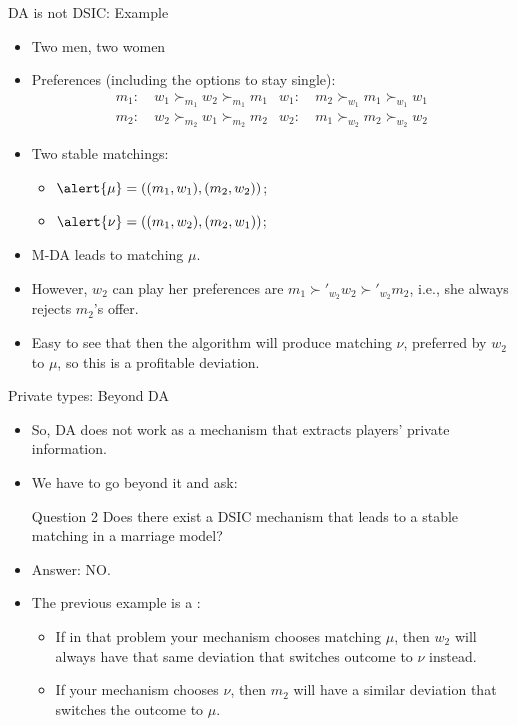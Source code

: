 \documentclass[english,10pt
,aspectratio=169
]{beamer}
\begin{document}
\begin{frame}{DA is not DSIC: Example}
\begin{example}
	\begin{itemize}
		\item Two men, two women
		\item Preferences (including the options to stay single):
		{\footnotesize 
			\begin{align*}
				m_1:& \ w_1 \succ_{m_1} w_2 \succ_{m_1} m_1 	& w_1:& \ m_2 \succ_{w_1} m_1 \succ_{w_1} w_1
				\\
				m_2:& \ w_2 \succ_{m_2} w_1 \succ_{m_2} m_2 	& w_2:& \ m_1 \succ_{w_2} m_2 \succ_{w_2} w_2
			\end{align*}
		}
		\item Two stable matchings: 
		\begin{itemize}
			\item $\alert{\mu} = \left( (m_1,w_1), (m_2,w_2)  \right)$;
			\item $\alert{\nu} = \left( (m_1,w_2), (m_2,w_1)  \right)$;
		\end{itemize}
		\item M-DA leads to matching $\mu$.
		\item However, $w_2$ can play  her preferences are $m_1 \succ'_{w_2} w_2 \succ'_{w_2} m_2$,
		i.e., she always rejects $m_2$'s offer.
		\item Easy to see that then the algorithm will produce matching $\nu$, preferred by $w_2$ to $\mu$, so this is a profitable deviation.
	\end{itemize}
\end{example}
\end{frame}


\begin{frame}{Private types: Beyond DA}
\begin{itemize}
	\item So, DA does not work as a mechanism that extracts players' private information.
	\item We have to go beyond it and ask:
	\begin{block}{Question 2}
		Does there exist a DSIC mechanism that leads to a stable matching in a marriage model?
	\end{block}
	\item Answer: \alert{NO}.
	\item The previous example is a :
	\begin{itemize}
		\item If in that problem your mechanism chooses matching $\mu$, then $w_2$ will always have that same deviation that switches outcome to $\nu$ instead.
		\item If your mechanism chooses $\nu$, then $m_2$ will have a similar deviation that switches the outcome to $\mu$.
	\end{itemize}
\end{itemize}
\end{frame}
\end{document}
